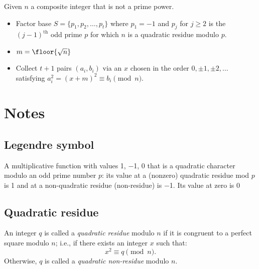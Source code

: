 \documentclass{article}
\begin{document}
Given $n$ a composite integer that is not a prime power.

\begin{itemize}
    \item
        Factor base $S=\{p_1,p_2,\ldots,p_t\}$
        where $p_1=-1$ and $p_j$ for $j\ge 2$ is the $(j-1)^\text{th}$ odd prime
        $p$ for which $n$ is a quadratic residue modulo $p$.
    \item
        $m=\floor{\sqrt n}$
    \item
        Collect $t+1$ pairs $(a_i,b_i)$
        via an $x$ chosen in the order $0,\pm 1,\pm 2,\ldots$
        satisfying $a_i^2=(x+m)^2\equiv b_i\pmod n$.
\end{itemize}

\section{Notes}

\subsection{Legendre symbol}

A multiplicative function with values 1, −1, 0
that is a quadratic character modulo an odd prime number $p$:
its value at a (nonzero) quadratic residue mod $p$ is 1
and at a non-quadratic residue (non-residue)
is −1. Its value at zero is 0

\subsection{Quadratic residue}

An integer $q$ is called a \emph{quadratic residue} modulo $n$
if it is congruent to a perfect square modulo $n$;
i.e., if there exists an integer $x$ such that:
\[
    x^2 \equiv q\pmod n.
\]
Otherwise, $q$ is called a \emph{quadratic non-residue} modulo $n$.
\end{document}
